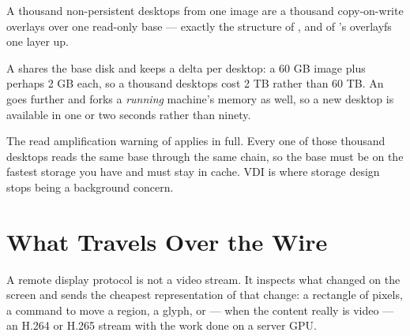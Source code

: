 \begin{conceptbox}
A thousand non-persistent desktops from one image are a thousand
copy-on-write overlays over one read-only base --- exactly the structure of
, and of 's overlayfs one layer up.

\smallskip
A  shares the base disk and keeps a delta per desktop:
a 60 GB image plus perhaps 2 GB each, so a thousand desktops cost 2 TB rather
than 60 TB. An  goes further and forks a \emph{running}
machine's memory as well, so a new desktop is available in one or two seconds
rather than ninety.

\smallskip
The read amplification warning of  applies in full. Every one of
those thousand desktops reads the same base through the same chain, so the base
must be on the fastest storage you have and must stay in cache. VDI is where
storage design stops being a background concern.
\end{conceptbox}

\section{What Travels Over the Wire}

A remote display protocol is not a video stream. It inspects what changed on
the screen and sends the cheapest representation of that change: a rectangle of
pixels, a command to move a region, a glyph, or --- when the content really is
video --- an H.264 or H.265 stream with the work done on a server GPU.

